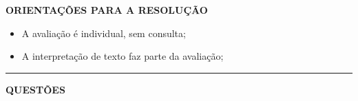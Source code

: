 \documentclass[12pt,a4paper]{article}
\begin{document}
\vspace{0.3cm}

\textbf{ORIENTAÇÕES PARA A RESOLUÇÃO}  

\begin{itemize}
    \item A avaliação é individual, sem consulta;
    \item A interpretação de texto faz parte da avaliação;
\end{itemize}

\vspace{0.5cm}

\begin{center}
    \rule{\textwidth}{0.4pt}
    \textbf{QUESTÕES}
\end{center}

\vspace{0.2cm}
\end{document}
